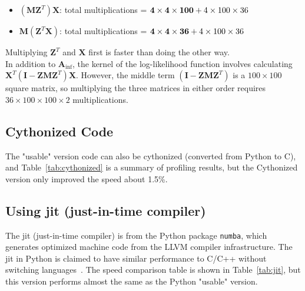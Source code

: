 \begin{itemize} 
\item $(\mathbf{M}\mathbf{Z}^T) \mathbf{X}$: total multiplications = ${\bf{4 \times 4 \times 100}} + 4 \times 100 \times 36$
\item $\mathbf{M} (\mathbf{Z}^T\mathbf{X})$: total multiplications = ${\bf{4 \times 4 \times 36}} + 4 \times 100 \times 36$
\end{itemize}
Multiplying $\mathbf{Z}^T$ and $\mathbf{X}$ first is faster than doing the other way.\\

In addition to $\mathbf{A}_{\text{inf}}$, the kernel of the log-likelihood function involves calculating $\mathbf{X}^T (\mathbf{I} - \mathbf{Z}\mathbf{M}\mathbf{Z}^T)\mathbf{X}$. However, the middle term $(\mathbf{I} - \mathbf{Z}\mathbf{M}\mathbf{Z}^T)$ is a $100 \times 100$ square matrix, so multiplying the three matrices in either order requires $36 \times 100 \times 100 \times 2$ multiplications.

\subsection{Cythonized Code}
The "usable" version code can also be cythonized (converted from Python to C), and Table~\ref{tab:cythonized} is a summary of profiling results, but the Cythonized version only improved the speed about 1.5\%.

\subsection{Using jit (just-in-time compiler)}

The jit (just-in-time compiler) is from the Python package \texttt{numba}, which generates optimized machine code from the LLVM compiler infrastructure. The jit in Python is claimed to have similar performance to C/C++ without switching languages~\cite{numba}. The speed comparison table is shown in Table~\ref{tab:jit}, but this version performs almost the same as the Python "usable" version.


